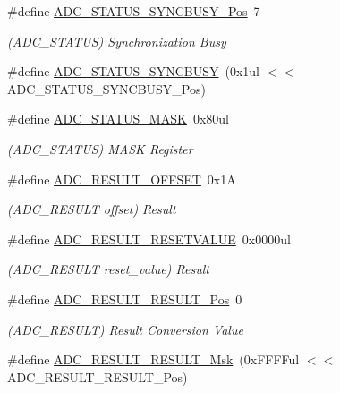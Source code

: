 \begin{DoxyCompactItemize}
\#define \mbox{\hyperlink{group___s_a_m_d21___a_d_c_ga865dbc1ceac0439b2063f2f5357c17e9}{A\+D\+C\+\_\+\+S\+T\+A\+T\+U\+S\+\_\+\+S\+Y\+N\+C\+B\+U\+S\+Y\+\_\+\+Pos}}~7
\begin{DoxyCompactList}\small\item\em (A\+D\+C\+\_\+\+S\+T\+A\+T\+US) Synchronization Busy \end{DoxyCompactList}\item 
\#define \mbox{\hyperlink{group___s_a_m_d21___a_d_c_gabeaffe5703047a45fe7ccee39dacc5bd}{A\+D\+C\+\_\+\+S\+T\+A\+T\+U\+S\+\_\+\+S\+Y\+N\+C\+B\+U\+SY}}~(0x1ul $<$$<$ A\+D\+C\+\_\+\+S\+T\+A\+T\+U\+S\+\_\+\+S\+Y\+N\+C\+B\+U\+S\+Y\+\_\+\+Pos)
\item 
\#define \mbox{\hyperlink{group___s_a_m_d21___a_d_c_ga467db33a24f7f8143bd25064921cc59e}{A\+D\+C\+\_\+\+S\+T\+A\+T\+U\+S\+\_\+\+M\+A\+SK}}~0x80ul
\begin{DoxyCompactList}\small\item\em (A\+D\+C\+\_\+\+S\+T\+A\+T\+US) M\+A\+SK Register \end{DoxyCompactList}\item 
\#define \mbox{\hyperlink{group___s_a_m_d21___a_d_c_gac871a3e42abade7bd3d2dcbf3172ce95}{A\+D\+C\+\_\+\+R\+E\+S\+U\+L\+T\+\_\+\+O\+F\+F\+S\+ET}}~0x1A
\begin{DoxyCompactList}\small\item\em (A\+D\+C\+\_\+\+R\+E\+S\+U\+LT offset) Result \end{DoxyCompactList}\item 
\#define \mbox{\hyperlink{group___s_a_m_d21___a_d_c_gad872ef8122ad10f58a6546072b5157c4}{A\+D\+C\+\_\+\+R\+E\+S\+U\+L\+T\+\_\+\+R\+E\+S\+E\+T\+V\+A\+L\+UE}}~0x0000ul
\begin{DoxyCompactList}\small\item\em (A\+D\+C\+\_\+\+R\+E\+S\+U\+LT reset\+\_\+value) Result \end{DoxyCompactList}\item 
\#define \mbox{\hyperlink{group___s_a_m_d21___a_d_c_ga32c8bee520d5fa7ad752a631166250f8}{A\+D\+C\+\_\+\+R\+E\+S\+U\+L\+T\+\_\+\+R\+E\+S\+U\+L\+T\+\_\+\+Pos}}~0
\begin{DoxyCompactList}\small\item\em (A\+D\+C\+\_\+\+R\+E\+S\+U\+LT) Result Conversion Value \end{DoxyCompactList}\item 
\#define \mbox{\hyperlink{group___s_a_m_d21___a_d_c_ga62f7022b6431b384071429474546da50}{A\+D\+C\+\_\+\+R\+E\+S\+U\+L\+T\+\_\+\+R\+E\+S\+U\+L\+T\+\_\+\+Msk}}~(0x\+F\+F\+F\+Ful $<$$<$ A\+D\+C\+\_\+\+R\+E\+S\+U\+L\+T\+\_\+\+R\+E\+S\+U\+L\+T\+\_\+\+Pos)

\end{DoxyCompactItemize}
